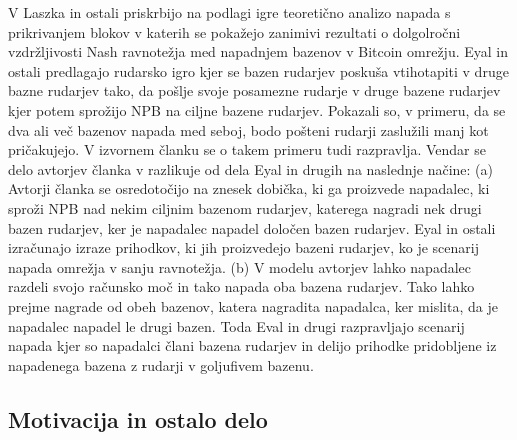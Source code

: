 \documentclass[12pt]{article}
\begin{document}
V \cite{financialcryptography} Laszka in ostali priskrbijo na podlagi igre teoretično analizo napada s prikrivanjem blokov v katerih se pokažejo zanimivi rezultati o dolgolročni vzdržljivosti Nash ravnotežja med napadnjem bazenov v Bitcoin omrežju. Eyal in ostali \cite{minnersdilemma} predlagajo rudarsko igro kjer se bazen rudarjev poskuša vtihotapiti v druge bazne rudarjev tako, da pošlje svoje posamezne rudarje v druge bazene rudarjev kjer potem sprožijo NPB na ciljne bazene rudarjev. Pokazali so, v primeru, da se dva ali več bazenov napada med seboj, bodo pošteni rudarji zaslužili manj kot pričakujejo. V izvornem članku se o takem primeru tudi razpravlja. Vendar se delo avtorjev članka v \cite{originalarticle} razlikuje od dela Eyal in drugih \cite{minnersdilemma} na naslednje načine: (a) Avtorji članka se osredotočijo na znesek dobička, ki ga proizvede napadalec, ki sproži NPB nad nekim ciljnim bazenom rudarjev, katerega nagradi nek drugi bazen rudarjev, ker je napadalec napadel določen bazen rudarjev. Eyal in ostali izračunajo izraze prihodkov, ki jih proizvedejo bazeni rudarjev, ko je scenarij napada omrežja v sanju ravnotežja. (b) V modelu avtorjev \cite{originalarticle} lahko napadalec razdeli svojo računsko moč in tako napada oba bazena rudarjev. Tako lahko prejme nagrade od obeh bazenov, katera nagradita napadalca, ker mislita, da je napadalec napadel le drugi bazen. Toda Eval in drugi razpravljajo scenarij napada kjer so napadalci člani bazena rudarjev in delijo prihodke pridobljene iz napadenega bazena z rudarji v goljufivem bazenu.

\subsection{Motivacija in ostalo delo}
\end{document}
